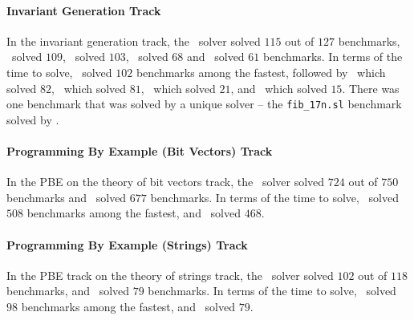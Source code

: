 \paragraph{Invariant Generation Track}
In the invariant generation track, the \lig\ solver solved $115$ out of $127$ benchmarks, \cvcnew\ solved $109$,
\dryd\ solved $103$, \horndini\ solved $68$ and \eusolvernew\ solved $61$ benchmarks.
In terms of the time to solve, \lig\ solved $102$ benchmarks among the fastest, followed by \cvcnew\ which solved $82$,
\dryd\ which solved $81$, \horndini\ which solved $21$, and \eusolvernew\ which solved $15$.
There was one benchmark that was solved by a unique solver -- the \texttt{fib_17n.sl} benchmark solved by \lig. 

\paragraph{Programming By Example (Bit Vectors) Track}
In the PBE on the theory of bit vectors track, the \cvcnew\ solver solved $724$ out of $750$ benchmarks
and \eusolvernew\ solved $677$ benchmarks.
In terms of the time to solve, \cvcnew\ solved $508$ benchmarks among the fastest,
and \eusolvernew\ solved $468$.

\paragraph{Programming By Example (Strings) Track}
In the PBE track on the theory of strings track, the \cvcnew\ solver solved $102$ out of $118$ benchmarks,
and \eusolvernew\ solved $79$ benchmarks.
In terms of the time to solve, \cvcnew\ solved $98$ benchmarks among the fastest,
and \eusolvernew\ solved $79$.
